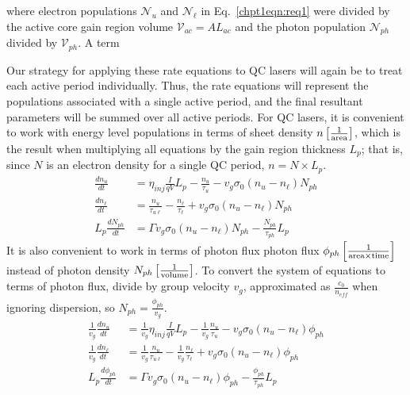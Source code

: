 \documentclass[12pt]{report}
\begin{document}
where electron populations $\mathcal{N}_u$ and $\mathcal{N}_\ell$ in Eq.~\eqref{chpt1eqn:req1} were divided by the active core gain region volume $\mathcal{V}_{ac}=A L_{ac}$ and the photon population $\mathcal{N}_{ph}$ divided by $\mathcal{V}_{ph}$.  A term

Our strategy for applying these rate equations to QC lasers will again be to treat each active period individually.  Thus, the rate equations will represent the populations associated with a single active period, and the final resultant parameters will be summed over all active periods.  For QC lasers, it is convenient to work with energy level populations in terms of sheet density $n \left[\frac{1}{\textnormal{area}}\right]$, which is the result when multiplying all equations by the gain region thickness $L_p$; that is, since $N$ is an electron density for a single QC period, $n=N\times L_p$.
\begin{subequations}
\begin{align}
\frac{d n_u}{dt}&=\eta_\textit{inj} \frac{I}{q V} L_p-\frac{n_u}{\tau_u}-v_g \sigma_0 (n_u-n_\ell) N_{ph}\\
\frac{d n_\ell}{dt}&=\frac{n_u}{\tau_{u\ell}}-\frac{n_\ell}{\tau_\ell}+v_g \sigma_0 (n_u-n_\ell) N_{ph}\\
L_p \frac{d N_{ph}}{dt}&=\Gamma v_g \sigma_0 (n_u-n_\ell) N_{ph} - \frac{N_{ph}}{\tau_{ph}} L_p
\end{align}
\end{subequations}
It is also convenient to work in terms of photon flux photon flux $\phi_{ph} \left[\frac{1}{\textnormal{area}\times\textnormal{time}}\right]$ instead of photon density $N_{ph} \left[\frac{1}{\textnormal{volume}}\right]$.  To convert the system of equations to terms of photon flux, divide by group velocity $v_g$, approximated as $\frac{c_0}{n_\textit{eff}}$ when ignoring dispersion, so $N_{ph}=\frac{\phi_{ph}}{v_g}$.
\begin{subequations}
\begin{align}
\frac{1}{v_g} \frac{d n_u}{dt}&=\frac{1}{v_g} \eta_\textit{inj} \frac{I}{q V} L_p-\frac{1}{v_g} \frac{n_u}{\tau_u}-v_g \sigma_0 (n_u-n_\ell) \phi_{ph}\\
\frac{1}{v_g} \frac{d n_\ell}{dt}&=\frac{1}{v_g} \frac{n_u}{\tau_{u\ell}}-\frac{1}{v_g} \frac{n_\ell}{\tau_\ell}+v_g \sigma_0 (n_u-n_\ell) \phi_{ph}\\
L_p \frac{d \phi_{ph}}{dt}&=\Gamma v_g \sigma_0 (n_u-n_\ell) \phi_{ph} - \frac{\phi_{ph}}{\tau_{ph}} L_p
\end{align}
\end{subequations}
\end{document}

